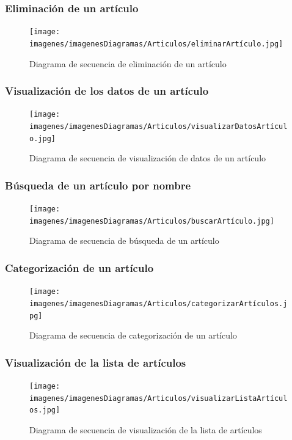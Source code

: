 \subsubsection{Eliminación de un artículo}

\begin{figure}[H]
	\centering
	\texttt{[image: imagenes/imagenesDiagramas/Articulos/eliminarArtículo.jpg]}
	\caption{Diagrama de secuencia de eliminación de un artículo}
	\label{fig:seqdiag5}
\end{figure}

\subsubsection{Visualización de los datos de un artículo}

\begin{figure}[H]
	\centering
	\texttt{[image: imagenes/imagenesDiagramas/Articulos/visualizarDatosArtículo.jpg]}
	\caption{Diagrama de secuencia de visualización de datos de un artículo}
	\label{fig:seqdiag6}
\end{figure}

\subsubsection{Búsqueda de un artículo por nombre}

\begin{figure}[H]
	\centering
	\texttt{[image: imagenes/imagenesDiagramas/Articulos/buscarArtículo.jpg]}
	\caption{Diagrama de secuencia de búsqueda de un artículo}
	\label{fig:seqdiag7}
\end{figure}

\subsubsection{Categorización de un artículo}

\begin{figure}[H]
	\centering
	\texttt{[image: imagenes/imagenesDiagramas/Articulos/categorizarArtículos.jpg]}
	\caption{Diagrama de secuencia de categorización de un artículo}
	\label{fig:seqdiag8}
\end{figure}

\subsubsection{Visualización de la lista de artículos}

\begin{figure}[H]
	\centering
	\texttt{[image: imagenes/imagenesDiagramas/Articulos/visualizarListaArtículos.jpg]}
	\caption{Diagrama de secuencia de visualización de la lista de artículos}
	\label{fig:seqdiag9}
\end{figure}

